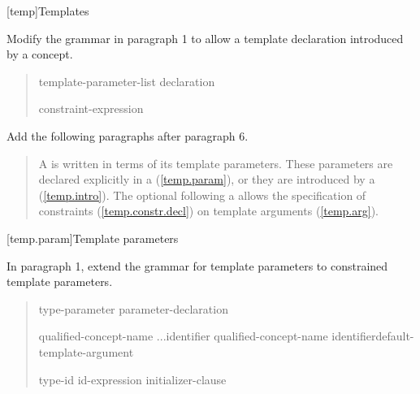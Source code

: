 
\setcounter{chapter}{13}
[temp]{Templates}

Modify the  grammar in paragraph 1 to 
allow a template declaration introduced by a concept.

\begin{quote}
\pnum

\begin{bnf}
\br
   \terminal{<} template-parameter-list \terminal{>}
     declaration\br

\begin{addedblock}
\br
   constraint-expression
\end{addedblock}
\end{bnf}

\end{quote}
  
Add the following paragraphs after paragraph 6.

\begin{quote}
\begin{addedblock}
\setcounter{Paras}{6}
\pnum
A  is written in terms of its template 
parameters. These parameters are declared explicitly in a 
 (\ref{temp.param}), or they are
introduced by a  (\ref{temp.intro}).
%
The optional  following a
 allows the specification of
constraints (\ref{temp.constr.decl}) on template arguments (\ref{temp.arg}).
\end{addedblock}
\end{quote}


[temp.param]{Template parameters}

In paragraph 1, extend the grammar for template parameters to 
constrained template parameters.

\begin{quote}
\pnum
\vspace{-\the\baselineskip}

\begin{bnf}
\br
  type-parameter\br
  parameter-declaration\br
\end{bnf}

\begin{bnf}
\begin{addedblock}
\br
  qualified-concept-name ...\opt identifier\opt\br
  qualified-concept-name identifier\opt default-template-argument\opt

\br
  \terminal{=} type-id\br
  \terminal{=} id-expression\br
  \terminal{=} initializer-clause
\end{addedblock}
\end{bnf}
\end{quote}

